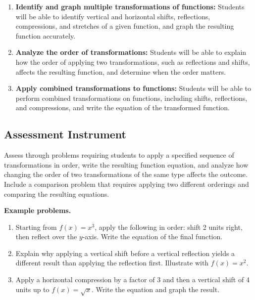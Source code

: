 \begin{enumerate}
    \item \textbf{Identify and graph multiple transformations of functions:} Students will be able to identify vertical and horizontal shifts, reflections, compressions, and stretches of a given function, and graph the resulting function accurately.
    \item \textbf{Analyze the order of transformations:} Students will be able to explain how the order of applying two transformations, such as reflections and shifts, affects the resulting function, and determine when the order matters.
    \item \textbf{Apply combined transformations to functions:} Students will be able to perform combined transformations on functions, including shifts, reflections, and compressions, and write the equation of the transformed function.
\end{enumerate}

\subsection{Assessment Instrument}
\label{ssec:asse-e613}

Assess through problems requiring students to apply a specified sequence of
transformations in order, write the resulting function equation, and analyze how changing
the order of two transformations of the same type affects the outcome. Include a
comparison problem that requires applying two different orderings and comparing the
resulting equations.

\textbf{Example problems.}

\begin{enumerate}
    \item Starting from $f(x) = x^3$, apply the following in order: shift 2 units right, then reflect over the $y$-axis. Write the equation of the final function.
    \item Explain why applying a vertical shift before a vertical reflection yields a different result than applying the reflection first. Illustrate with $f(x) = x^2$.
    \item Apply a horizontal compression by a factor of 3 and then a vertical shift of 4 units up to $f(x) = \sqrt{x}$. Write the equation and graph the result.
\end{enumerate}
